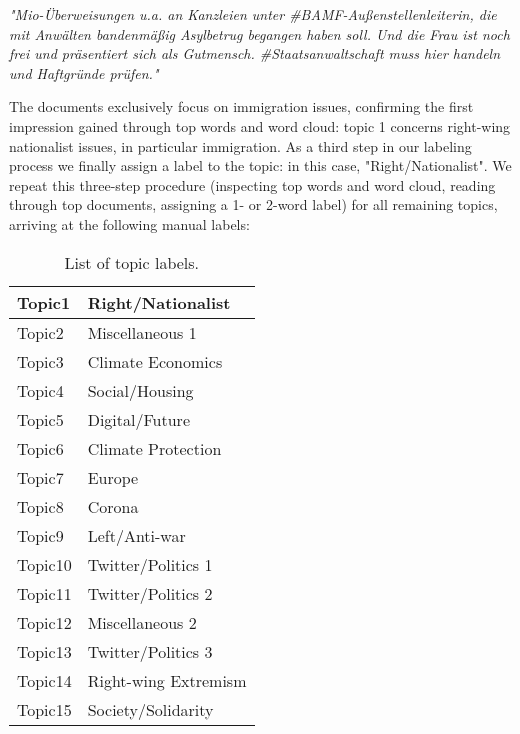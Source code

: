\documentclass[12pt]{article}
\begin{document}
\vspace{0.5cm}
\noindent
\textit{"Mio-Überweisungen u.a. an Kanzleien unter \#BAMF-Außenstellenleiterin, die mit Anwälten bandenmäßig Asylbetrug begangen haben soll. Und die Frau ist noch frei und präsentiert sich als Gutmensch. \#Staatsanwaltschaft muss hier handeln und Haftgründe prüfen."}
\vspace{0.5cm}

The documents exclusively focus on immigration issues, confirming the first impression gained through top words and word cloud: topic 1 concerns right-wing nationalist issues, in particular immigration. As a third step in our labeling process we finally assign a label to the topic: in this case, "Right/Nationalist". We repeat this three-step procedure (inspecting top words and word cloud, reading through top documents, assigning a 1- or 2-word label) for all remaining topics, arriving at the following manual labels:

\begin{table}[h!]
	\centering
	\captionsetup{justification=centering,margin=2cm}
	\begin{tabular}{|l|l|}
	\hline
	Topic1  & Right/Nationalist    \\ \hline
	Topic2  & Miscellaneous 1      \\ \hline
	Topic3  & Climate Economics    \\ \hline
	Topic4  & Social/Housing       \\ \hline
	Topic5  & Digital/Future       \\ \hline
	Topic6  & Climate Protection   \\ \hline
	Topic7  & Europe               \\ \hline
	Topic8  & Corona               \\ \hline
	Topic9  & Left/Anti-war        \\ \hline
	Topic10 & Twitter/Politics 1   \\ \hline
	Topic11 & Twitter/Politics 2   \\ \hline
	Topic12 & Miscellaneous 2      \\ \hline
	Topic13 & Twitter/Politics 3   \\ \hline
	Topic14 & Right-wing Extremism \\ \hline
	Topic15 & Society/Solidarity   \\ \hline
	\end{tabular}
	\caption{List of topic labels.}
	\label{tab:labels}
\end{table}
\end{document}
